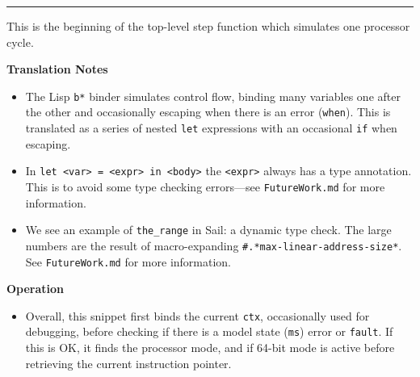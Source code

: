 \documentclass[a4paper]{article}
\begin{document}
\begin{tcolorbox}
\begin{parcolumns}{2}
\colplacechunks
\hrule

\colplacechunks
\end{parcolumns}


This is the beginning of the top-level step function which simulates one processor cycle.

\noindent
\textbf{Translation Notes}
\begin{itemize}
  \item The Lisp \texttt{b*} binder simulates control flow, binding many variables one after the other and occasionally escaping when there is an error (\texttt{when}).  This is translated as a series of nested \texttt{let} expressions with an occasional \texttt{if} when escaping.
  \item In \texttt{let <var> = <expr> in <body>} the \texttt{<expr>} always has a type annotation.  This is to avoid some type checking errors---see \texttt{FutureWork.md} for more information.
  \item We see an example of \texttt{the\_range} in Sail: a dynamic type check.  The large numbers are the result of macro-expanding \texttt{\#.*max-linear-address-size*}.  See \texttt{FutureWork.md} for more information.
\end{itemize}

\noindent
\textbf{Operation}
\begin{itemize}
  \item Overall, this snippet first binds the current \texttt{ctx}, occasionally used for debugging, before checking if there is a model state (\texttt{ms}) error or \texttt{fault}.  If this is OK, it finds the processor mode, and if 64-bit mode is active before retrieving the current instruction pointer.
\end{itemize}
  
\end{tcolorbox}
\end{document}
